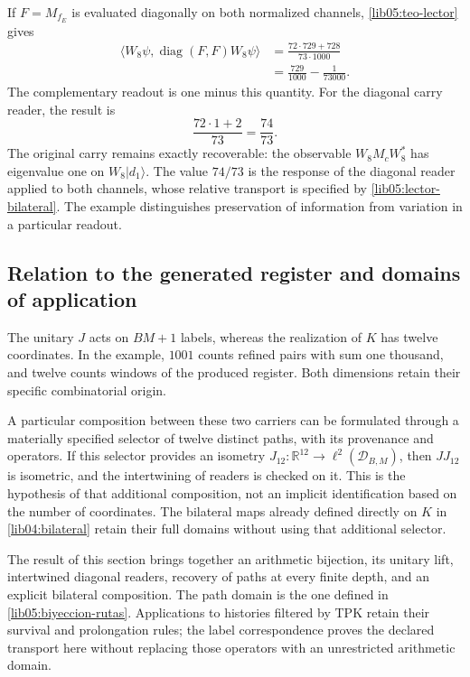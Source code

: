 If \(F=M_{f_E}\) is evaluated diagonally on both normalized
channels, \cref{lib05:teo-lector} gives
\begin{equation}
 \begin{split}
 \langle W_8\psi,\operatorname{diag}(F,F)W_8\psi\rangle
 &=\frac{72\cdot729+728}{73\cdot1000}\\
 &=\frac{729}{1000}-\frac1{73000}.
 \end{split}
 \label{lib05:ejemplo-fraccion}
\end{equation}
The complementary readout is one minus this quantity. For the
diagonal carry reader, the result is
\begin{equation}
 \frac{72\cdot1+2}{73}=\frac{74}{73}.
 \label{lib05:ejemplo-acarreo}
\end{equation}
The original carry remains exactly recoverable: the
observable \(W_8M_cW_8^*\) has eigenvalue one on
\(W_8|d_1\rangle\). The value \(74/73\) is the response of the
diagonal reader applied to both channels, whose relative transport
is specified by \eqref{lib05:lector-bilateral}. The example
distinguishes preservation of information from variation in a particular
readout.

\subsection{Relation to the generated register and domains of application}
\label{lib05:dominios}

The unitary \(J\) acts on \(BM+1\) labels, whereas
the realization of \(K\) has twelve coordinates. In the example,
\(1001\) counts refined pairs with sum one thousand, and twelve counts
windows of the produced register. Both dimensions retain their
specific combinatorial origin.

A particular composition between these two carriers can be formulated
through a materially specified selector of twelve distinct paths, with its
provenance and operators. If this selector provides an
isometry
\(J_{12}:\mathbb R^{12}\to\ell^2(\mathcal D_{B,M})\), then
\(JJ_{12}\) is isometric, and the intertwining of readers is
checked on it. This is the hypothesis of that additional
composition, not an implicit identification based on the number of
coordinates. The bilateral maps already defined directly
on \(K\) in \cref{lib04:bilateral} retain their full domains
without using that additional selector.

The result of this section brings together an arithmetic bijection, its
unitary lift, intertwined diagonal readers, recovery of paths at
every finite depth, and an explicit bilateral composition.
The path domain is the one defined in
\eqref{lib05:biyeccion-rutas}. Applications to histories
filtered by TPK retain their survival and prolongation
rules; the label correspondence proves the declared
transport here without replacing those operators with an unrestricted
arithmetic domain.
